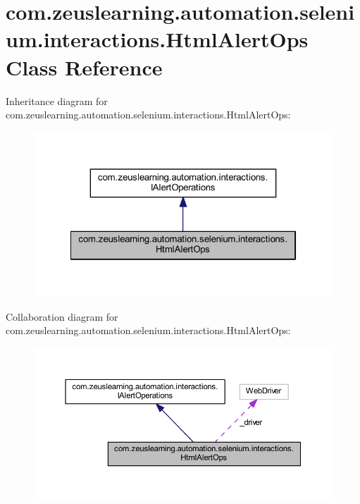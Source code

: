 \hypertarget{classcom_1_1zeuslearning_1_1automation_1_1selenium_1_1interactions_1_1HtmlAlertOps}{}\section{com.\+zeuslearning.\+automation.\+selenium.\+interactions.\+Html\+Alert\+Ops Class Reference}
\label{classcom_1_1zeuslearning_1_1automation_1_1selenium_1_1interactions_1_1HtmlAlertOps}


Inheritance diagram for com.\+zeuslearning.\+automation.\+selenium.\+interactions.\+Html\+Alert\+Ops\+:\nopagebreak
\begin{figure}[H]
\begin{center}
\leavevmode
\includegraphics[width=322pt]{dc/d89/classcom_1_1zeuslearning_1_1automation_1_1selenium_1_1interactions_1_1HtmlAlertOps__inherit__graph}
\end{center}
\end{figure}


Collaboration diagram for com.\+zeuslearning.\+automation.\+selenium.\+interactions.\+Html\+Alert\+Ops\+:\nopagebreak
\begin{figure}[H]
\begin{center}
\leavevmode
\includegraphics[width=350pt]{dd/da7/classcom_1_1zeuslearning_1_1automation_1_1selenium_1_1interactions_1_1HtmlAlertOps__coll__graph}
\end{center}
\end{figure}
